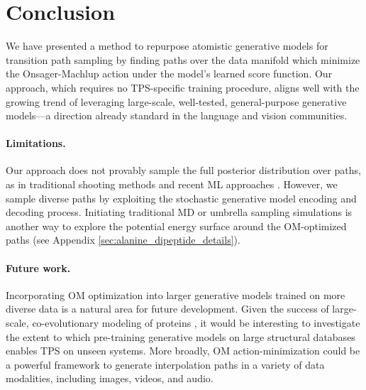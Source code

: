 \section{Conclusion}
We have presented a method to repurpose atomistic generative models for transition path sampling by finding paths over the data manifold which minimize the Onsager-Machlup action under the model's learned score function. Our approach, which requires no TPS-specific training procedure, aligns well with the growing trend of leveraging large-scale, well-tested, general-purpose generative models—a direction already standard in the language and vision communities. 
\vspace{-6pt}
\paragraph{Limitations.} Our approach does not provably sample the full posterior distribution over paths, as in traditional shooting methods and recent ML approaches \cite{du2024doob}. However, we sample diverse paths by exploiting the stochastic generative model encoding and decoding process. Initiating traditional MD or umbrella sampling simulations is another way to explore the potential energy surface around the OM-optimized paths (see Appendix \ref{sec:alanine_dipeptide_details}).
\vspace{-6pt}
\paragraph{Future work.} Incorporating OM optimization into larger generative models trained on more diverse data \cite{lewis2024scalable, jing2024alphafoldmeetsflowmatching} is a natural area for future development. Given the success of large-scale, co-evolutionary modeling of proteins \cite{jumper2021highly}, it would be interesting to investigate the extent to which pre-training generative models on large structural databases enables TPS on unseen systems. More broadly, OM action-minimization could be a powerful framework to generate interpolation paths in a variety of data modalities, including images, videos, and audio.

